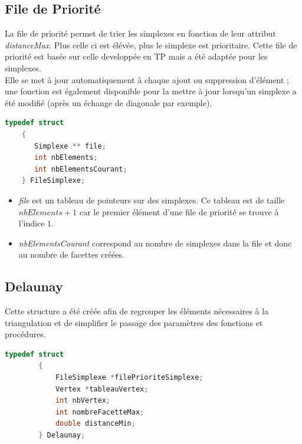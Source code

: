 \documentclass{article}
\begin{document}
    \subsection{File de Priorité}
    
    La file de priorité permet de trier les simplexes en fonction de leur attribut \textit{distanceMax}. Plus celle ci est élévée, plus le simplexe est prioritaire. Cette file de priorité est basée sur celle developpée en TP mais a été adaptée pour les simplexes.
    \\Elle se met à jour automatiquement à chaque ajout ou suppression d'élément ; une fonction est également disponible pour la mettre à jour lorsqu'un simplexe a été modifié (après un échange de diagonale par exemple).
    
    \begin{lstlisting}[caption={la structure FileSimplexe},language=C,label=file]
    typedef struct 
    {
       Simplexe ** file; 
       int nbElements;	
       int nbElementsCourant;
    } FileSimplexe;
	\end{lstlisting}
    
    \begin{itemize}
    \item \textit{file} est un tableau de pointeurs sur des simplexes. Ce tableau est de taille $nbElements + 1$ car le premier élément d'une file de priorité se trouve à l'indice $1$.
    \item  \textit{nbElementsCourant} correspond au nombre de simplexes dans la file et donc au nombre de facettes créées.
    \end{itemize}

    \subsection{Delaunay}
    \label{structureDelaunay}
    
    Cette structure a été créée afin de regrouper les éléments nécessaires à la triangulation et de simplifier le passage des paramètres des fonctions et procédures.
    
    \begin{lstlisting}[caption={la structure Delaunay},language=C,label=delaunay]
        typedef struct 
        {
        	FileSimplexe *filePrioriteSimplexe;
        	Vertex *tableauVertex;
        	int nbVertex;
        	int nombreFacetteMax;
        	double distanceMin;
        } Delaunay;
	\end{lstlisting}
	
\end{document}

